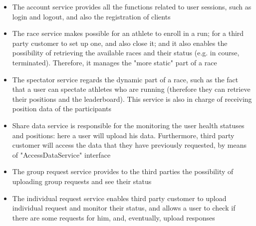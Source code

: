 \begin{itemize}
\item The account service provides all the functions related to user sessions, such as login and logout,
and also the registration of clients 
\item The race service makes possible for an athlete to enroll in a run; for a third party customer to set
up one, and also close it; and it also enables the possibility of retrieving the available races and their
status (e.g. in course, terminated). Therefore, it manages the "more static" part
of a race
\item The spectator service regards the dynamic part of a race, such as the fact that a user can spectate
athletes who are running (therefore they can retrieve their positions and the leaderboard). This
service is also in charge of receiving position data of the participants
\item Share data service is responsible for the monitoring the user health statuses and positions: here a
user will upload his data. Furthermore, third party customer will access the data that they have
previously requested, by means of "AccessDataService" interface
\item The group request service provides to the third parties the possibility of uploading group requests and see their status 
\item The individual request service enables third party customer to upload individual request and monitor their status, and allows 
a user to check if there are some requests for him, and, eventually, upload responses 
\end{itemize}

